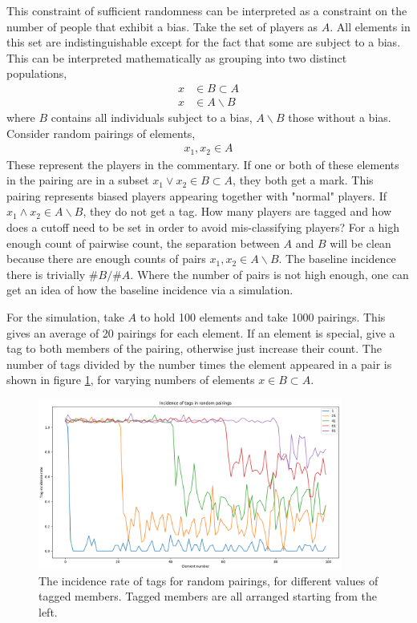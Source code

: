 \documentclass[10pt, a4paper]{UUThesisTemplate}
\begin{document}
This constraint of sufficient randomness can be interpreted as a constraint on the number of people that exhibit a bias. Take the set of players as $A$. All elements in this set are indistinguishable except for the fact that some are subject to a bias. This can be interpreted mathematically as grouping into two distinct populations,
\begin{align}
x&\in B\subset A\\
x&\in A \backslash B
\end{align} 
where $B$ contains all individuals subject to a bias, $A\backslash B$ those without a bias. Consider random pairings of elements,
\begin{align}
x_1, x_2 \in A
\end{align}
These represent the players in the commentary. If one or both of these elements in the pairing are in a subset $x_1 \vee x_2 \in B\subset A$, they both get a mark. This pairing represents biased players appearing together with "normal" players. If $x_1 \wedge x_2 \in A\backslash B$, they do not get a tag. How many players are tagged and how does a cutoff need to be set in order to avoid mis-classifying players? For a high enough count of pairwise count, the separation between $A$ and $B$ will be clean because there are enough counts of pairs $x_1, x_2\in A\backslash B$. The baseline incidence there is trivially $\#B / \# A$. Where the number of pairs is not high enough, one can get an idea of how the baseline incidence via a simulation.

For the simulation, take $A$ to hold 100 elements and take 1000 pairings. This gives an average of 20 pairings for each element. If an element is special, give a tag to both members of the pairing, otherwise just increase their count. The number of tags divided by the number times the element appeared in a pair is shown in figure \ref{fig:pairings}, for varying numbers of elements $x \in B \subset A$.

\begin{figure}\centering
\includegraphics[width=10cm]{figures/random_pairings.png}
\caption{The incidence rate of tags for random pairings, for different values of tagged members. Tagged members are all arranged starting from the left.}\label{fig:pairings}
\end{figure}
\end{document}
